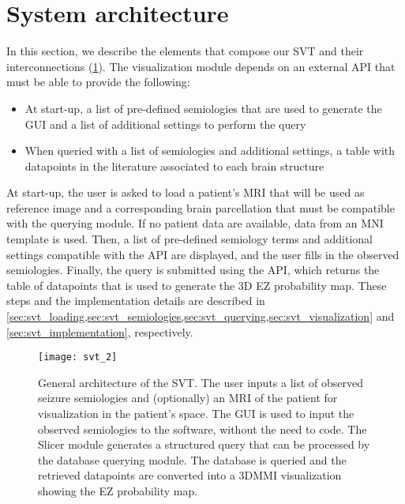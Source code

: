 \section{System architecture}

In this section, we describe the elements that compose our \ac{SVT} and their interconnections (\cref{fig:svt_architecture}).
The visualization module depends on an external \ac{API} that must be able to provide the following:
\begin{itemize}
  \item At start-up, a list of pre-defined semiologies that are used to generate the \ac{GUI} and a list of additional settings to perform the query
  \item When queried with a list of semiologies and additional settings, a table with datapoints in the literature associated to each brain structure
\end{itemize}

At start-up, the user is asked to load a patient's \ac{MRI} that will be used as reference image and a corresponding brain parcellation that must be compatible with the querying module.
If no patient data are available, data from an \ac{MNI} template is used.
Then, a list of pre-defined semiology terms and additional settings compatible with the \ac{API} are displayed, and the user fills in the observed semiologies.
Finally, the query is submitted using the \ac{API}, which returns the table of datapoints that is used to generate the 3D \ac{EZ} probability map.
These steps and the implementation details are described in \cref{sec:svt_loading,sec:svt_semiologies,sec:svt_querying,sec:svt_visualization} and \cref{sec:svt_implementation}, respectively.

\begin{figure}
  \centering
  \texttt{[image: svt\_2]}
  \caption[General architecture of the Semiology Visualization Tool]{
    General architecture of the \ac{SVT}.
    The user inputs a list of observed seizure semiologies and (optionally) an \ac{MRI} of the patient for visualization in the patient's space.
    The \ac{GUI} is used to input the observed semiologies to the software, without the need to code.
    The Slicer module generates a structured query that can be processed by the database querying module.
    The database is queried and the retrieved datapoints are converted into a \ac{3DMMI} visualization showing the \ac{EZ} probability map.
  }
  \label{fig:svt_architecture}
\end{figure}


